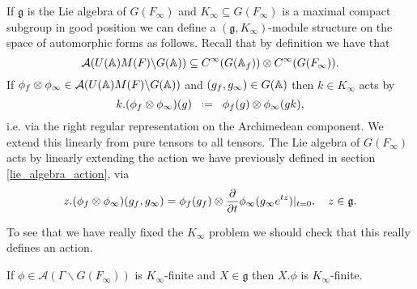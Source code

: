 If \(\mathfrak{g}\) is the Lie algebra of \(G(F_\infty)\) and \(K_\infty\subseteq G(F_\infty)\) is a maximal compact subgroup in good position we can define a \((\mathfrak{g}, K_\infty)\)-module structure on the space of automorphic forms as follows. Recall that by definition we have that 
\[\mathcal{A}(U(\A)M(F)\backslash G(\A)) \subseteq C^\infty(G(\A_f)) \tensor C^\infty(G(F_\infty)).\]
If \(\phi_f\tensor \phi_\infty \in \mathcal{A}(U(\A)M(F)\backslash G(\A)) \) and \((g_f, g_\infty)\in G(\A)\) then \(k\in K_\infty\) acts by 
\[k.(\phi_f\tensor \phi_\infty)(g) \defeq \phi_f(g) \tensor \phi_\infty(gk),\]
i.e. via the right regular representation on the Archimedean component. We extend this linearly from pure tensors to all tensors. The Lie algebra of \(G(F_\infty)\) acts by linearly extending the action we have previously defined in section \ref{lie_algebra_action}, via
\[z.(\phi_f\tensor \phi_\infty)(g_f, g_\infty) = \phi_f(g_f)\tensor \Dif{}{t}\phi_\infty(g_\infty e^{tz})|_{t=0}, \quad z\in \mathfrak{g}.\] 

To see that we have really fixed the \(K_\infty\) problem we should check that this really defines an action. 

\begin{Lemma}
	If \(\phi\in \mathcal{A}(\Gamma \backslash G(F_\infty))\) is \(K_\infty\)-finite and \(X\in \mathfrak{g}\) then \(X.\phi\) is \(K_\infty\)-finite.
\end{Lemma}


